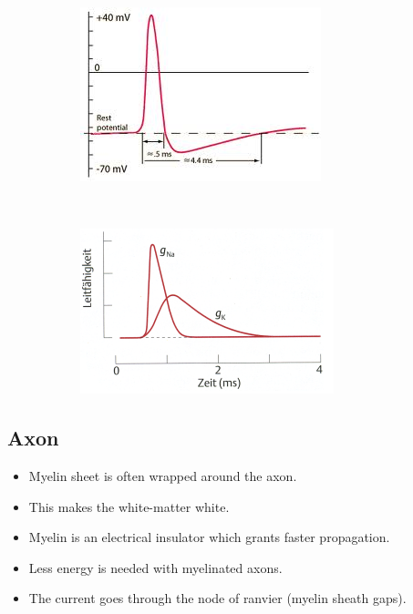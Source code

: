 \documentclass[a4paper, 12pt]{article}
\begin{document}
\begin{figure}[H]
	\centering
	\begin{subfigure}[b]{0.5\textwidth}
		\centering
		\includegraphics[width=\textwidth]{voltage-source-in-membrane2.png}
	\end{subfigure}%
	~
	\begin{subfigure}[b]{0.5\textwidth}
		\centering
		\includegraphics[width=\textwidth]{action_potential_02.png}
	\end{subfigure}
\end{figure}

\subsection{Axon}
\begin{itemize}[noitemsep,nolistsep]
	\item Myelin sheet is often wrapped around the axon.
	\item This makes the white-matter white.
	\item Myelin is an electrical insulator which grants faster propagation.
	\item Less energy is needed with myelinated axons.
	\item The current goes through the node of ranvier (myelin sheath gaps).
\end{itemize}
\end{document}
